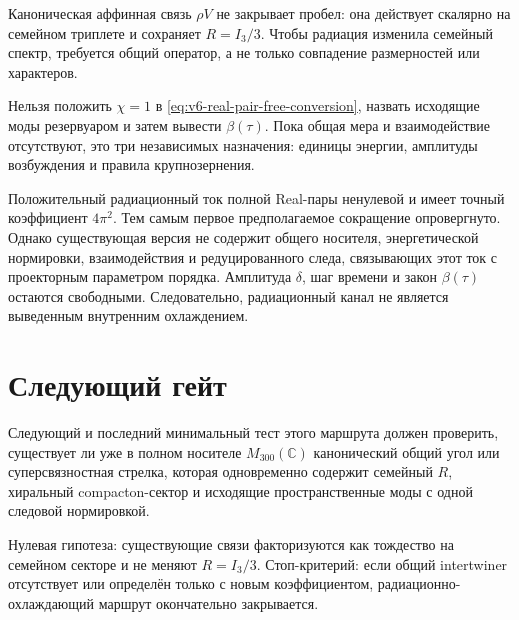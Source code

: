 Каноническая аффинная связь $\rho V$ не закрывает пробел: она действует
скалярно на семейном триплете и сохраняет $R=I_3/3$. Чтобы радиация
изменила семейный спектр, требуется общий оператор, а не только совпадение
размерностей или характеров.

\begin{nogocriterion}
Нельзя положить $\chi=1$ в
\eqref{eq:v6-real-pair-free-conversion}, назвать исходящие моды
резервуаром и затем вывести $\beta(\tau)$. Пока общая мера и
взаимодействие отсутствуют, это три независимых назначения: единицы
энергии, амплитуды возбуждения и правила крупнозернения.
\end{nogocriterion}

\begin{theorem}
Положительный радиационный ток полной Real-пары ненулевой и имеет точный
коэффициент $4\pi^2$. Тем самым первое предполагаемое сокращение
опровергнуто. Однако существующая версия не содержит общего носителя,
энергетической нормировки, взаимодействия и редуцированного следа,
связывающих этот ток с проекторным параметром порядка. Амплитуда
$\delta$, шаг времени и закон $\beta(\tau)$ остаются свободными.
Следовательно, радиационный канал не является выведенным внутренним
охлаждением.
\end{theorem}

\section{Следующий гейт}

Следующий и последний минимальный тест этого маршрута
должен проверить, существует ли уже в полном носителе
$M_{300}(\mathbb C)$ канонический общий угол или суперсвязностная стрелка,
которая одновременно содержит семейный $R$, хиральный compacton-сектор и
исходящие пространственные моды с одной следовой нормировкой.

Нулевая гипотеза: существующие связи факторизуются как тождество на
семейном секторе и не меняют $R=I_3/3$. Стоп-критерий: если общий
intertwiner отсутствует или определён только с новым коэффициентом,
радиационно-охлаждающий маршрут окончательно закрывается.

